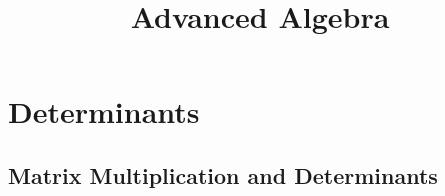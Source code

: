 \documentclass[12pt, a4paper, oneside]{book}
\begin{document}
\frontmatter
\title{{ \Huge{\textbf{Advanced Algebra} }}}
\maketitle
{}
\tableofcontents %




\mainmatter
\chapter{Determinants}


\section{Matrix Multiplication and Determinants}
\end{document}
